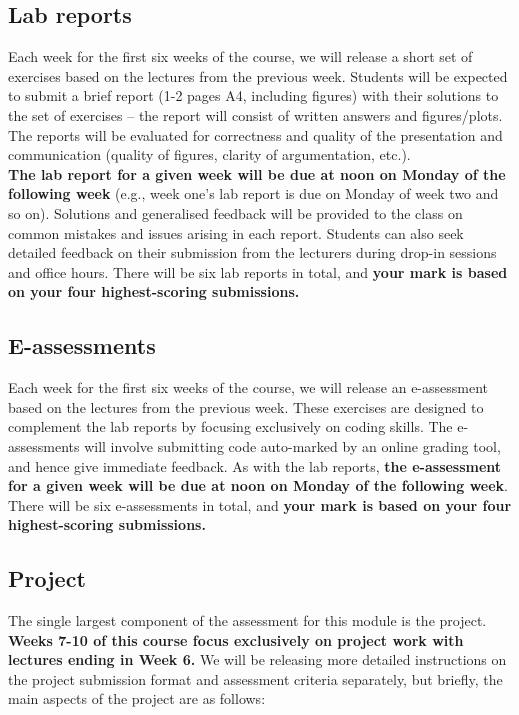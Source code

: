 \documentclass[
  letterpaper,
  DIV=11,
  numbers=noendperiod]{scrreprt}
\begin{document}
\subsection*{Lab reports}\label{lab-reports}

Each week for the first six weeks of the course, we will release a short
set of exercises based on the lectures from the previous week. Students
will be expected to submit a brief report (1-2 pages A4, including
figures) with their solutions to the set of exercises -- the report will
consist of written answers and figures/plots. The reports will be
evaluated for correctness and quality of the presentation and
communication (quality of figures, clarity of argumentation, etc.).\\
\textbf{The lab report for a given week will be due at noon on Monday of
the following week} (e.g., week one's lab report is due on Monday of
week two and so on). Solutions and generalised feedback will be provided
to the class on common mistakes and issues arising in each report.
Students can also seek detailed feedback on their submission from the
lecturers during drop-in sessions and office hours. There will be six
lab reports in total, and \textbf{your mark is based on your four
highest-scoring submissions.}

\subsection*{E-assessments}\label{e-assessments}

Each week for the first six weeks of the course, we will release an
e-assessment based on the lectures from the previous week. These
exercises are designed to complement the lab reports by focusing
exclusively on coding skills. The e-assessments will involve submitting
code auto-marked by an online grading tool, and hence give immediate
feedback. As with the lab reports, \textbf{the e-assessment for a given
week will be due at noon on Monday of the following week}. There will be
six e-assessments in total, and \textbf{your mark is based on your four
highest-scoring submissions.}

\subsection*{Project}\label{project}

The single largest component of the assessment for this module is the
project. \textbf{Weeks 7-10 of this course focus exclusively on project
work with lectures ending in Week 6.} We will be releasing more detailed
instructions on the project submission format and assessment criteria
separately, but briefly, the main aspects of the project are as follows:
\end{document}
